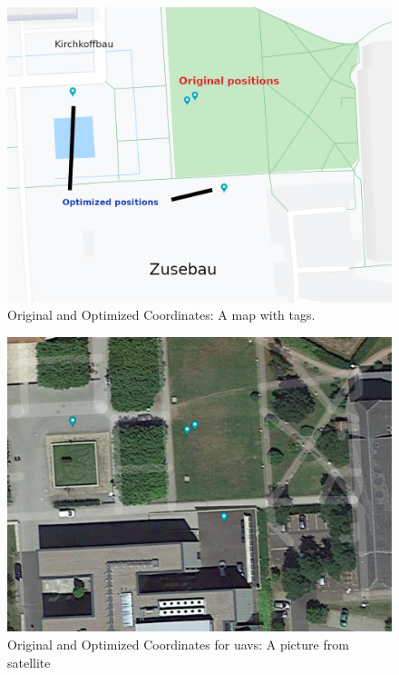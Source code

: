 \begin{figure}[H]
	\centering
	\includegraphics[width=\linewidth,keepaspectratio]{images/Expt4_Result_of_optimization_map_with_names.png}
\caption{Original and Optimized Coordinates: A map with tags.}
\label{fig:optimized-coordinates-on-logical-map}
\end{figure}

\begin{figure}[H]
	\centering
	\includegraphics[width=\linewidth,keepaspectratio]{images/Expt4_Result_of_optimization_sattelite.png}
\caption{Original and Optimized Coordinates for \glspl{uav}: A picture from satellite}
\label{fig:optimized-coordinates-satellite-map}
\end{figure}


